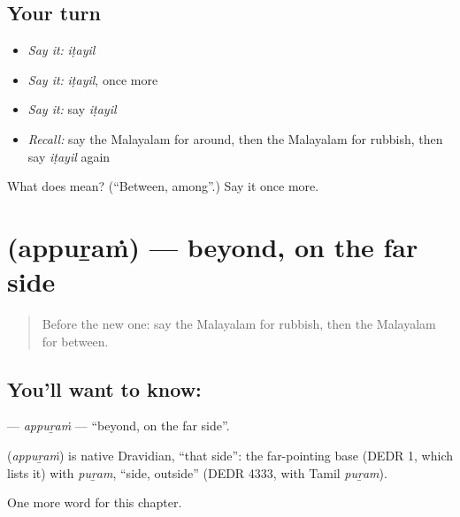 \subsection*{Your turn}
\begin{itemize}
\raggedright
  \item \emph{Say it:} \emph{iṭayil}
  \item \emph{Say it:} \emph{iṭayil}, once more
  \item \emph{Say it:} say \emph{iṭayil}
  \item \emph{Recall:} say the Malayalam for around, then the Malayalam for rubbish, then say \emph{iṭayil} again
\end{itemize}

\begin{tcolorbox}[breakable,colback=teal!4,colframe=teal!35!black,title={Before you move on}]
What does  mean? (\textquotedblleft{}Between, among\textquotedblright{}.) Say it once more.
\end{tcolorbox}
\section[\texorpdfstring{\ml{അപ്പുറം} (appuṟaṁ)}{അപ്പുറം (appuṟaṁ)}]{ (appuṟaṁ) — beyond, on the far side}

\label{lesson:ML-C199-appuram}



\begin{quote}
Before the new one: say the Malayalam for rubbish, then the Malayalam for between.
\end{quote}

\subsection*{You'll want to know: }
\textbf{} — \emph{appuṟaṁ} — \textquotedblleft{}beyond, on the far side\textquotedblright{}.

\begin{cousinweb}
\textbf{} (\emph{appuṟaṁ}) is native Dravidian, \textquotedblleft{}that side\textquotedblright{}: the far-pointing base (DEDR 1, which lists it) with \emph{puṟam}, \textquotedblleft{}side, outside\textquotedblright{} (DEDR 4333, with Tamil \emph{puṟam}).
\end{cousinweb}

\begin{grammarlens}[title={What you've built}]
One more word for this chapter.
\end{grammarlens}

